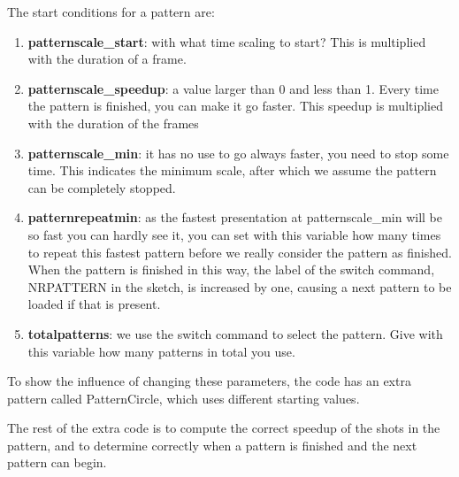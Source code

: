 {The start conditions for a pattern are:
\begin{enumerate}
 \item \textbf{patternscale\_start}: with what time scaling to start? This is multiplied with the duration of a frame.
 \item \textbf{patternscale\_speedup}: a value larger than 0 and less than 1. Every time the pattern is finished, you can make it go faster. This speedup is multiplied with the duration of the frames
 \item \textbf{patternscale\_min}: it has no use to go always faster, you need to stop some time. This indicates the minimum scale, after which we assume the pattern can be completely stopped.
 \item \textbf{patternrepeatmin}: as the fastest presentation at patternscale\_min will be so fast you can hardly see it, you can set with this variable how many times to repeat this fastest pattern before we really consider the pattern as finished. When the pattern is finished in this way, the label of the switch command, NRPATTERN in the sketch, is increased by one, causing a next pattern to be loaded if that is present.
 \item \textbf{totalpatterns}: we use the switch command to select the pattern. Give with this variable how many patterns in total you use. 
\end{enumerate}
To show the influence of changing these parameters, the code has an extra pattern called PatternCircle, which uses different starting values.

The rest of the extra code is to compute the correct speedup of the shots in the pattern, and to determine correctly when a pattern is finished and the next pattern can begin.
}

